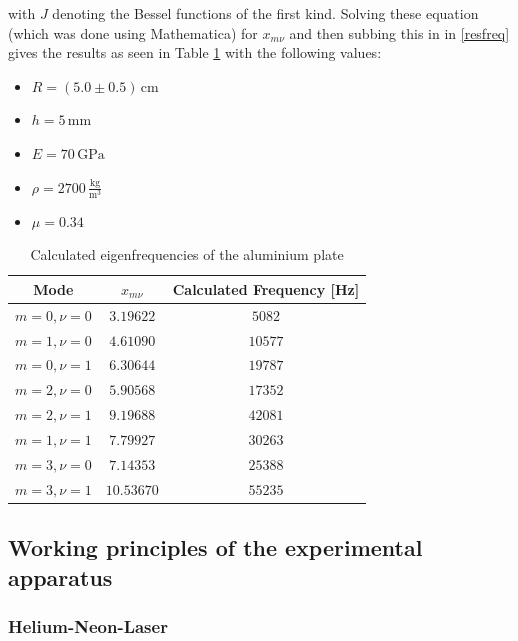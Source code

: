 with $J$ denoting the Bessel functions of the first kind. Solving these equation (which was done using Mathematica) for $x_{m\nu}$ and then subbing this in in \ref{resfreq} gives the results as seen in Table \ref{tab:eigen} with the following values:

\begin{itemize}
	\item $ R = (5.0\pm0.5)\,\mathrm{cm}$
	\item $h=5\,\mathrm{mm}$
	\item $E=70\,\mathrm{GPa}$
	\item $\rho = 2700\,\frac{\mathrm{kg}}{\mathrm{m^3}}$
	\item $\mu = 0.34$ 
\end{itemize} 

\begin{table}[h]
\centering
	\begin{tabular}{c|c|c}
		Mode 		& $x_{m\nu}$ & Calculated Frequency [Hz] 	 \\ \hline\hline
		$m=0,\nu=0$	&$3.19622$   &$5082$						\\ \hline
		$m=1,\nu=0$	& $4.61090$  & $10577$					\\ \hline
		$m=0,\nu=1$	& $6.30644$  & $19787$					\\ \hline
		$m=2,\nu=0$	& $5.90568$  & $17352$					\\ \hline
		$m=2,\nu=1$	& $9.19688$  & $42081$					\\ \hline
		$m=1,\nu=1$	& $7.79927$  & $30263$				     \\ \hline
		$m=3,\nu=0$	& $7.14353$  & $25388$                \\ \hline
     	$m=3,\nu=1$	& $10.53670$ & $55235$
	\end{tabular} \vskip 0.2cm
	\caption{Calculated eigenfrequencies of the aluminium plate}
	\label{tab:eigen}
\end{table}





\subsection{Working principles of the experimental apparatus}

\subsubsection{Helium-Neon-Laser \label{HeNe1}}

